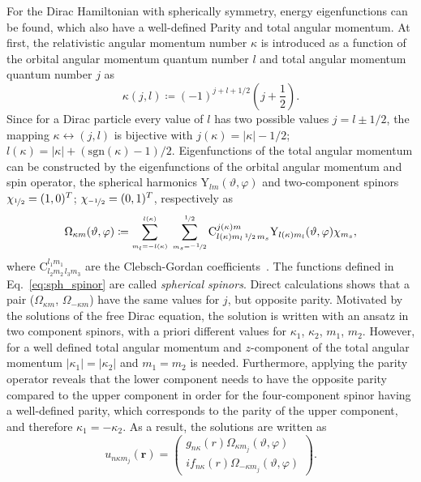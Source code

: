 For the Dirac Hamiltonian with spherically symmetry, energy eigenfunctions can be found, which also have a well-defined Parity and total angular momentum. At first, the relativistic angular momentum number $\kappa$ is introduced as a function of the orbital angular momentum quantum number $l$ and total angular momentum quantum number $j$ as
\begin{equation}
\kappa(j,l) \coloneqq (-1)^{j+l+1/2} \left(j+\frac{1}{2}\right).
\end{equation}
Since for a Dirac particle every value of $l$ has two possible values $j=l\pm 1/2$, the mapping $\kappa \leftrightarrow (j,l)$ is bijective with $j(\kappa)=|\kappa|-1/2$; $l(\kappa)=|\kappa|+(\mathrm{sgn}(\kappa)-1)/2$. Eigenfunctions of the total angular momentum can be constructed by the eigenfunctions of the orbital angular momentum and spin operator, the spherical harmonics $\text{Y}_{lm}(\vartheta,\varphi)$ and two-component spinors $\chi_{\nicefrac{1}{2}}=(1,0)^T$; $\chi_{\nicefrac{-1}{2}}=(0,1)^T$, respectively as
\begin{equation}
\Omega_{\kappa m}(\vartheta,\varphi)\coloneqq
\sum_{{\scriptscriptstyle {m_l}{=}{-l(\kappa)}}}^{\scriptscriptstyle l(\kappa)}\;
\sum_{{\scriptscriptstyle {m_s}{=}{\nicefrac{-1}{2}}}}^{\scriptscriptstyle \nicefrac{1}{2}}
\text{C}^{j(\kappa)m}_{l(\kappa)m_l\,\nicefrac{1}{2}\,m_s}
\text{Y}_{l(\kappa)m_l}(\vartheta,\varphi)\chi_{m_s},
\label{eq:sph_spinor}
\end{equation}
where $\text{C}^{l_1m_1}_{l_2m_2\,l_3m_3}$ are the Clebsch-Gordan coefficients~\cite{varshalovich1988}. The functions defined in Eq.~\eqref{eq:sph_spinor} are called \textit{spherical spinors}. Direct calculations shows that a pair ($\Omega_{\kappa m}$, $\Omega_{-\kappa m}$) have the same values for $j$, but opposite parity. Motivated by the solutions of the free Dirac equation, the solution is written with an ansatz in two component spinors, with a priori different values for $\kappa_1$, $\kappa_2$, $m_1$, $m_2$. 
However, for a well defined total angular momentum and $z$-component of the total angular momentum $|\kappa_1|=|\kappa_2|$ and $m_1=m_2$ is needed. Furthermore, applying the parity operator reveals that the lower component needs to have the opposite parity compared to the upper component in order for the four-component spinor having a well-defined parity, which corresponds to the parity of the upper component, and therefore $\kappa_1=-\kappa_2$. As a result, the solutions are written as
\begin{equation}
u_{n\kappa m_j}(\mathbf{r})=
\begin{pmatrix}
g_{n\kappa}(r)\Omega_{\kappa m_j}(\vartheta,\varphi)\\
i f_{n\kappa}(r) \Omega_{-\kappa m_j}(\vartheta,\varphi)
\end{pmatrix}.
\label{eq:ansatz_dirac}
\end{equation}
